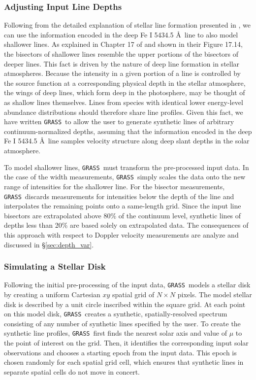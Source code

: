 \documentclass[twocolumn]{aastex63}
\newcommand{\grass}{\texttt{GRASS}}
\newcommand{\revise}[1]{#1}
\begin{document}
\subsubsection{Adjusting Input Line Depths} \label{sec:scale_chop}

Following from the detailed explanation of stellar line formation presented in \citet{Gray2008}, we \revise{can} use the information encoded in the deep Fe \textsc{I} 5434.5 \AA\ line to also model shallower lines. As explained in Chapter 17 of \citet{Gray2008} and shown in their Figure 17.14, the bisectors of shallower lines resemble the upper portions of the bisectors of deeper lines. This fact is driven by the nature of deep line formation in stellar atmospheres. Because the intensity in a given portion of a line is controlled by the source function at a corresponding physical depth in the stellar atmosphere, the wings of deep lines, which form deep in the photosphere, may be thought of as shallow lines themselves. Lines from species with identical lower energy-level abundance distributions should therefore share line profiles. Given this fact, we have written \grass\ to allow the user to generate synthetic lines of arbitrary continuum-normalized depths, assuming that the information encoded in the deep Fe \textsc{I} 5434.5 \AA\ line samples velocity structure along deep slant depths in the solar atmosphere. \par  

To model shallower lines, \grass\ must transform the pre-processed input data. In the case of the width measurements, \grass\ simply scales the data onto the new range of intensities for the shallower line. For the bisector measurements, \grass\ discards measurements for intensities below the depth of the line and interpolates the remaining points onto a same-length grid. \revise{Since the input line bisectors are extrapolated above 80\% of the continuum level, synthetic lines of depths less than 20\% are based solely on extrapolated data.} The consequences of this approach with respect to Doppler velocity measurements are analyze and discussed in \S\ref{sec:depth_var}. \par 

\subsubsection{Simulating a Stellar Disk} \label{sec:resolved_disk}
Following the initial pre-processing of the input data, \grass\ models a stellar disk by creating a uniform Cartesian $xy$ spatial grid of $N \times N$ pixels. The model stellar disk is described by a unit circle inscribed within the square grid. At each point on this model disk, \grass\ creates a synthetic, spatially-resolved spectrum consisting of any number of synthetic lines specified by the user. To create the synthetic line profiles, \grass\ first finds the nearest solar axis and value of $\mu$ to the point of interest on the grid. Then, it identifies the corresponding input solar observations and chooses a starting epoch from the input data. This epoch is chosen randomly for each spatial grid cell, which ensures that synthetic lines in separate spatial cells do not move in concert. \par 
\end{document}
